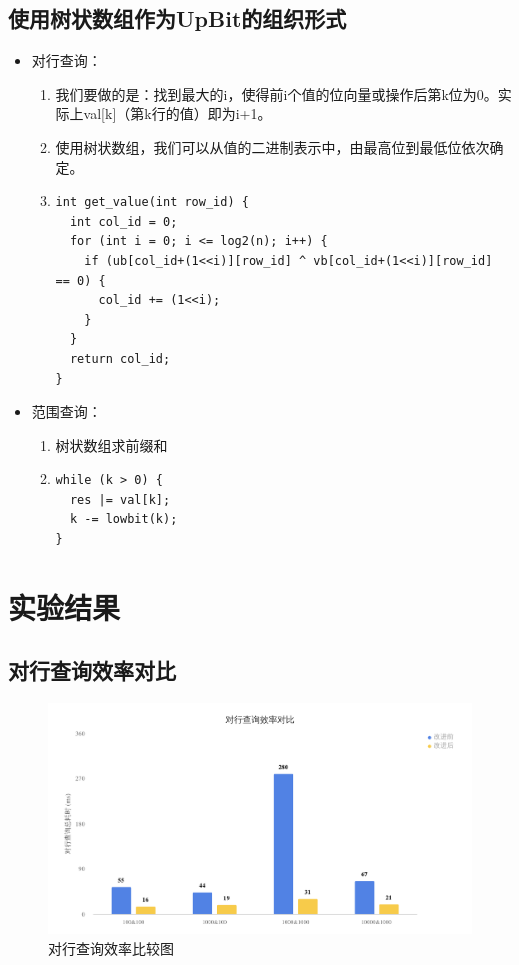 \documentclass[11pt, a4paper]{article}
\begin{document}
\subsection{使用树状数组作为UpBit的组织形式}
\begin{itemize}
\item 对行查询：
  \begin{enumerate}[1.]
  \item 我们要做的是：找到最大的i，使得前i个值的位向量或操作后第k位为0。实际上val[k]（第k行的值）即为i+1。
  \item 使用树状数组，我们可以从值的二进制表示中，由最高位到最低位依次确定。
  \item \begin{verbatim}
int get_value(int row_id) {
  int col_id = 0;
  for (int i = 0; i <= log2(n); i++) {
    if (ub[col_id+(1<<i)][row_id] ^ vb[col_id+(1<<i)][row_id] == 0) {
      col_id += (1<<i);
    }
  }
  return col_id;
}
  \end{verbatim}
  \end{enumerate}
\item 范围查询：
  \begin{enumerate}[1.]
  \item 树状数组求前缀和
  \item \begin{verbatim}
while (k > 0) {
  res |= val[k];
  k -= lowbit(k);
}
  \end{verbatim}
  \end{enumerate}
\end{itemize}

\section{实验结果}
\subsection{对行查询效率对比}
\begin{figure}[H]
  \begin{center}
    \includegraphics[width=6.5in]{row.png}
    \caption{对行查询效率比较图}\label{fig:row}
  \end{center}
\end{figure}
\end{document}
